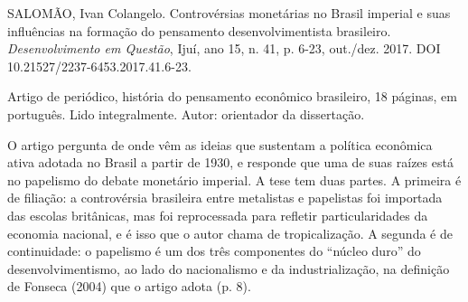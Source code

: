 
\begin{identificacao}
SALOMÃO, Ivan Colangelo. Controvérsias monetárias no Brasil imperial e suas
influências na formação do pensamento desenvolvimentista brasileiro.
\emph{Desenvolvimento em Questão}, Ijuí, ano 15, n. 41, p. 6-23, out./dez.
2017. DOI 10.21527/2237-6453.2017.41.6-23.

Artigo de periódico, história do pensamento econômico brasileiro, 18 páginas,
em português. Lido integralmente. Autor: orientador da dissertação.
\end{identificacao}

O artigo pergunta de onde vêm as ideias que sustentam a política econômica
ativa adotada no Brasil a partir de 1930, e responde que uma de suas raízes
está no papelismo do debate monetário imperial. A tese tem duas partes. A
primeira é de filiação: a controvérsia brasileira entre metalistas e papelistas
foi importada das escolas britânicas, mas foi reprocessada para refletir
particularidades da economia nacional, e é isso que o autor chama de
tropicalização. A segunda é de continuidade: o papelismo é um dos três
componentes do ``núcleo duro'' do desenvolvimentismo, ao lado do nacionalismo e
da industrialização, na definição de Fonseca (2004) que o artigo adota (p. 8).

